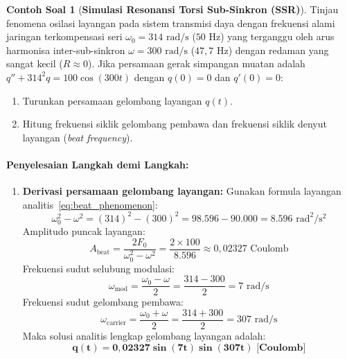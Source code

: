 \documentclass[11pt,a4paper]{article}
\theoremstyle{definition}
\newtheorem{example}{Contoh Soal}[section]
\begin{document}
\begin{example}[\textbf{Simulasi Resonansi Torsi Sub-Sinkron (SSR)}]
Tinjau fenomena osilasi layangan pada sistem transmisi daya dengan frekuensi alami jaringan terkompensasi seri $\omega_0 = 314\text{ rad/s}$ ($50\text{ Hz}$) yang terganggu oleh arus harmonisa inter-sub-sinkron $\omega = 300\text{ rad/s}$ ($47{,}7\text{ Hz}$) dengan redaman yang sangat kecil ($R \approx 0$).
Jika persamaan gerak simpangan muatan adalah $q'' + 314^2 q = 100 \cos(300 t)$ dengan $q(0) = 0$ dan $q'(0) = 0$:
\begin{enumerate}[label=(\alph*)]
    \item Turunkan persamaan gelombang layangan $q(t)$.
    \item Hitung frekuensi siklik gelombang pembawa dan frekuensi siklik denyut layangan (\textit{beat frequency}).
\end{enumerate}

\paragraph{Penyelesaian Langkah demi Langkah:}
\begin{enumerate}[label=(\alph*), leftmargin=*]
    \item \textbf{Derivasi persamaan gelombang layangan:}
    Gunakan formula layangan analitis~\eqref{eq:beat_phenomenon}:
    \begin{equation*}
        \omega_0^2 - \omega^2 = (314)^2 - (300)^2 = 98.596 - 90.000 = 8.596\text{ rad}^2/\text{s}^2
    \end{equation*}
    Amplitudo puncak layangan:
    \begin{equation*}
        A_{\text{beat}} = \frac{2 F_0}{\omega_0^2 - \omega^2} = \frac{2 \times 100}{8.596} \approx 0{,}02327\text{ Coulomb}
    \end{equation*}
    Frekuensi sudut selubung modulasi:
    \begin{equation*}
        \omega_{\text{mod}} = \frac{\omega_0 - \omega}{2} = \frac{314 - 300}{2} = 7\text{ rad/s}
    \end{equation*}
    Frekuensi sudut gelombang pembawa:
    \begin{equation*}
        \omega_{\text{carrier}} = \frac{\omega_0 + \omega}{2} = \frac{314 + 300}{2} = 307\text{ rad/s}
    \end{equation*}
    Maka solusi analitis lengkap gelombang layangan adalah:
    \begin{equation*}
        \mathbf{q(t) = 0{,}02327 \sin(7 t) \sin(307 t)\text{ [Coulomb]}}
    \end{equation*}


\end{enumerate}
\end{example}
\end{document}

